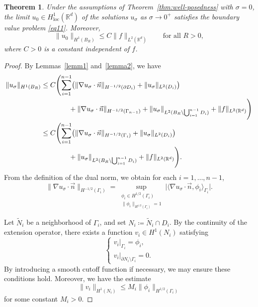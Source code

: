 \documentclass[12pt,reqno]{amsart}
\newtheorem{theorem}{Theorem}[section]
\numberwithin{equation}{section}
\begin{document}
\begin{theorem}
Under the assumptions of Theorem~\ref{thm:well-posedness} with $\sigma=0$, the limit $u_0 \in H^1_{\mathrm{loc}}(\mathbb{R}^d)$ of the solutions $u_\sigma$ as $\sigma \to 0^+$ satisfies the boundary value problem \eqref{eq11}. Moreover,
\begin{equation*}
    \|u_0\|_{H^1(B_R)} \le C \|f\|_{L^2(\mathbb{R}^d)} \qquad \text{for all } R > 0,
\end{equation*}
where $C > 0$ is a constant independent of  $f$.
\end{theorem}





\begin{proof}
By Lemmas~\ref{lemm1} and~\ref{lemma2}, we have
\begin{align}\label{eq16}
    \|u_\sigma\|_{H^1(B_R)} 
    &\le C \Biggl( \sum_{i=1}^{n-1} \bigl( \|\nabla u_\sigma\cdot\vec{n}\|_{H^{-1/2}(\partial D_i)} + \|u_\sigma\|_{L^2(D_i)} \bigr) \notag \\
    &\qquad \qquad + \|\nabla u_\sigma\cdot\vec{n}\|_{H^{-1/2}(\Gamma_{n-1})} + \|u_\sigma\|_{L^2(B_R \setminus \bigcup_{i=1}^{n-1} D_i)} + \|f\|_{L^2(\mathbb{R}^d)} \Biggr) \notag \\
    &\le C \Biggl( \sum_{i=1}^{n-1} \bigl( \|\nabla u_\sigma\cdot\vec{n}\|_{H^{-1/2}(\Gamma_i)} + \|u_\sigma\|_{L^2(D_i)} \bigr) \notag \\
    &\qquad \qquad + \|u_\sigma\|_{L^2(B_R \setminus \bigcup_{i=1}^{n-1} D_i)} + \|f\|_{L^2(\mathbb{R}^d)} \Biggr).
\end{align}
From the definition of the dual norm, we obtain for each $i = 1, \dots, n-1$,
\begin{equation}\label{eq17}
    \|\nabla u_\sigma\cdot\vec{n}\|_{H^{-1/2}(\Gamma_i)} = \sup_{\substack{\phi_i \in H^{1/2}(\Gamma_i) \\ \|\phi_i\|_{H^{1/2}(\Gamma_i)} = 1}} \bigl| \langle \nabla u_\sigma\cdot\vec{n}, \phi_i \rangle_{\Gamma_i} \bigr|.
\end{equation}

Let $\widetilde{N}_i$ be a neighborhood of $\Gamma_i$, and set $N_i \coloneqq \widetilde{N}_i \cap D_i$. By the continuity of the extension operator, there exists a function $v_i \in H^1(N_i)$ satisfying
\begin{equation*}
    \begin{cases}
        v_i|_{\Gamma_i} = \phi_i, \\
        v_i|_{\partial N_i \setminus \Gamma_i} = 0.
    \end{cases}
\end{equation*}
By introducing a smooth cutoff function if necessary, we may ensure these conditions hold. Moreover, we have the estimate
\begin{equation*}
    \|v_i\|_{H^1(N_i)} \le M_i \|\phi_i\|_{H^{1/2}(\Gamma_i)}
\end{equation*}
for some constant $M_i > 0$.


\end{proof}
\end{document}
